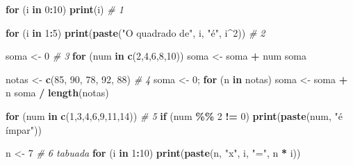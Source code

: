 \documentclass[
  portuguese,
  11pt,
  openany]{book}
\newenvironment{Shaded}{\begin{snugshade}}{\end{snugshade}}
\newcommand{\CommentTok}[1]{\textcolor[rgb]{0.56,0.35,0.01}{\textit{#1}}}
\newcommand{\ControlFlowTok}[1]{\textcolor[rgb]{0.13,0.29,0.53}{\textbf{#1}}}
\newcommand{\DecValTok}[1]{\textcolor[rgb]{0.00,0.00,0.81}{#1}}
\newcommand{\FunctionTok}[1]{\textcolor[rgb]{0.13,0.29,0.53}{\textbf{#1}}}
\newcommand{\NormalTok}[1]{#1}
\newcommand{\OtherTok}[1]{\textcolor[rgb]{0.56,0.35,0.01}{#1}}
\newcommand{\SpecialCharTok}[1]{\textcolor[rgb]{0.81,0.36,0.00}{\textbf{#1}}}
\newcommand{\StringTok}[1]{\textcolor[rgb]{0.31,0.60,0.02}{#1}}
\begin{document}
\begin{Shaded}
\begin{Highlighting}[]
\ControlFlowTok{for}\NormalTok{ (i }\ControlFlowTok{in} \DecValTok{0}\SpecialCharTok{:}\DecValTok{10}\NormalTok{) }\FunctionTok{print}\NormalTok{(i)                               }\CommentTok{\# 1}

\ControlFlowTok{for}\NormalTok{ (i }\ControlFlowTok{in} \DecValTok{1}\SpecialCharTok{:}\DecValTok{5}\NormalTok{) }\FunctionTok{print}\NormalTok{(}\FunctionTok{paste}\NormalTok{(}\StringTok{"O quadrado de"}\NormalTok{, i, }\StringTok{"é"}\NormalTok{, i}\SpecialCharTok{\^{}}\DecValTok{2}\NormalTok{))  }\CommentTok{\# 2}

\NormalTok{soma }\OtherTok{\textless{}{-}} \DecValTok{0}                                              \CommentTok{\# 3}
\ControlFlowTok{for}\NormalTok{ (num }\ControlFlowTok{in} \FunctionTok{c}\NormalTok{(}\DecValTok{2}\NormalTok{,}\DecValTok{4}\NormalTok{,}\DecValTok{6}\NormalTok{,}\DecValTok{8}\NormalTok{,}\DecValTok{10}\NormalTok{)) soma }\OtherTok{\textless{}{-}}\NormalTok{ soma }\SpecialCharTok{+}\NormalTok{ num}
\NormalTok{soma}

\NormalTok{notas }\OtherTok{\textless{}{-}} \FunctionTok{c}\NormalTok{(}\DecValTok{85}\NormalTok{, }\DecValTok{90}\NormalTok{, }\DecValTok{78}\NormalTok{, }\DecValTok{92}\NormalTok{, }\DecValTok{88}\NormalTok{)                         }\CommentTok{\# 4}
\NormalTok{soma }\OtherTok{\textless{}{-}} \DecValTok{0}\NormalTok{; }\ControlFlowTok{for}\NormalTok{ (n }\ControlFlowTok{in}\NormalTok{ notas) soma }\OtherTok{\textless{}{-}}\NormalTok{ soma }\SpecialCharTok{+}\NormalTok{ n}
\NormalTok{soma }\SpecialCharTok{/} \FunctionTok{length}\NormalTok{(notas)}

\ControlFlowTok{for}\NormalTok{ (num }\ControlFlowTok{in} \FunctionTok{c}\NormalTok{(}\DecValTok{1}\NormalTok{,}\DecValTok{3}\NormalTok{,}\DecValTok{4}\NormalTok{,}\DecValTok{6}\NormalTok{,}\DecValTok{9}\NormalTok{,}\DecValTok{11}\NormalTok{,}\DecValTok{14}\NormalTok{))                        }\CommentTok{\# 5}
  \ControlFlowTok{if}\NormalTok{ (num }\SpecialCharTok{\%\%} \DecValTok{2} \SpecialCharTok{!=} \DecValTok{0}\NormalTok{) }\FunctionTok{print}\NormalTok{(}\FunctionTok{paste}\NormalTok{(num, }\StringTok{"é ímpar"}\NormalTok{))}

\NormalTok{n }\OtherTok{\textless{}{-}} \DecValTok{7}                                                 \CommentTok{\# 6 tabuada}
\ControlFlowTok{for}\NormalTok{ (i }\ControlFlowTok{in} \DecValTok{1}\SpecialCharTok{:}\DecValTok{10}\NormalTok{) }\FunctionTok{print}\NormalTok{(}\FunctionTok{paste}\NormalTok{(n, }\StringTok{"x"}\NormalTok{, i, }\StringTok{"="}\NormalTok{, n }\SpecialCharTok{*}\NormalTok{ i))}
\end{Highlighting}
\end{Shaded}
\end{document}
